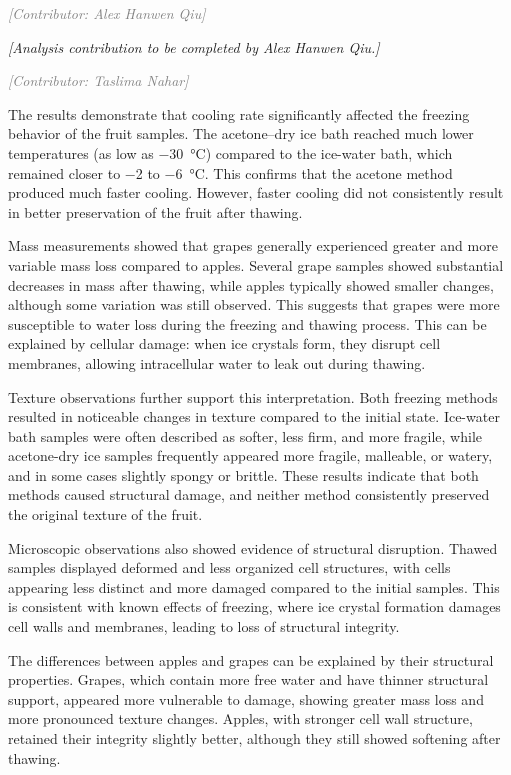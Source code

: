 \documentclass[12pt, a4paper]{article}
\newcommand{\contributor}[1]{\vspace{4pt}\noindent\textcolor{gray}{\small\textit{[Contributor: #1]}}\vspace{2pt}}
\begin{document}
\contributor{Alex Hanwen Qiu}


\textit{[Analysis contribution to be completed by Alex Hanwen Qiu.]}

\contributor{Taslima Nahar}

The results demonstrate that cooling rate significantly affected the
freezing behavior of the fruit samples. The acetone--dry ice bath
reached much lower temperatures (as low as $-$30~°C) compared to the
ice-water bath, which remained closer to $-$2 to $-$6~°C. This confirms
that the acetone method produced much faster cooling. However, faster
cooling did not consistently result in better preservation of the fruit
after thawing.

Mass measurements showed that grapes generally experienced greater and
more variable mass loss compared to apples. Several grape samples showed
substantial decreases in mass after thawing, while apples typically
showed smaller changes, although some variation was still observed. This
suggests that grapes were more susceptible to water loss during the
freezing and thawing process. This can be explained by cellular damage:
when ice crystals form, they disrupt cell membranes, allowing
intracellular water to leak out during thawing.

Texture observations further support this interpretation. Both freezing
methods resulted in noticeable changes in texture compared to the
initial state. Ice-water bath samples were often described as softer,
less firm, and more fragile, while acetone-dry ice samples frequently
appeared more fragile, malleable, or watery, and in some cases slightly
spongy or brittle. These results indicate that both methods caused
structural damage, and neither method consistently preserved the
original texture of the fruit.

Microscopic observations also showed evidence of structural disruption.
Thawed samples displayed deformed and less organized cell structures,
with cells appearing less distinct and more damaged compared to the
initial samples. This is consistent with known effects of freezing,
where ice crystal formation damages cell walls and membranes, leading to
loss of structural integrity.

The differences between apples and grapes can be explained by their
structural properties. Grapes, which contain more free water and have
thinner structural support, appeared more vulnerable to damage, showing
greater mass loss and more pronounced texture changes. Apples, with
stronger cell wall structure, retained their integrity slightly better,
although they still showed softening after thawing.
\end{document}
